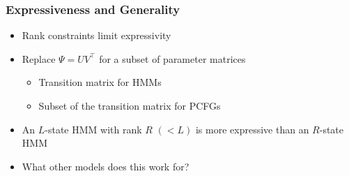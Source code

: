 \documentclass{beamer}
\begin{document}
\begin{frame}
\frametitle{Expressiveness and Generality}
\begin{itemize}
\item Rank constraints limit expressivity
\vspace{1em}
\item Replace $\Psi = UV^\top$ for a subset of parameter matrices
\vspace{1em}
    \begin{itemize}
    \item Transition matrix for HMMs
    \vspace{1em}
    \item Subset of the transition matrix for PCFGs
    \end{itemize}
\vspace{1em}
\item An $L$-state HMM with rank $R$ $(< L)$ is more
    expressive than an $R$-state HMM
\vspace{1em}
\item What other models does this work for?
\end{itemize}
\end{frame}
\end{document}
